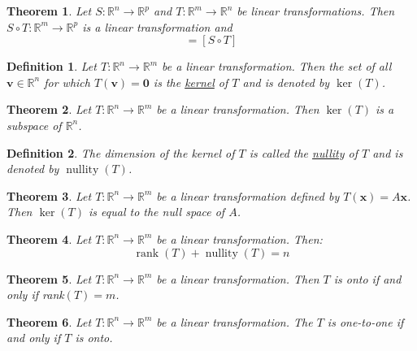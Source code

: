 \documentclass{article}
\theoremstyle{definitionstyle}
\newtheorem{definition}{Definition}[section]
\newtheorem{theorem}{Theorem}[section]
\begin{document}
\begin{theorem}
    Let $S:\mathbb{R}^n \to \mathbb{R}^p$ and $T:\mathbb{R}^m \to \mathbb{R}^n$ be linear transformations.
    Then $S \circ T: \mathbb{R}^m \to \mathbb{R}^p$ is a linear transformation and
    \begin{equation*}
        [S][T]=[S \circ T]
    \end{equation*}
\end{theorem}

\begin{definition}
    Let $T:\mathbb{R}^n \to \mathbb{R}^m$ be a linear transformation. Then the set of all $\mathbf{v} \in \mathbb{R}^n$
    for which $T(\mathbf{v})=\mathbf{0}$ is the \underline{kernel} of $T$ and is denoted by $\ker(T)$.
\end{definition}

\begin{theorem}
    Let $T:\mathbb{R}^n \to \mathbb{R}^m$ be a linear transformation. Then $\ker(T)$ is a
    subspace of $\mathbb{R}^n$.
\end{theorem}

\begin{definition}
    The dimension of the kernel of $T$ is called the \underline{nullity} of $T$ and is denoted
    by $\operatorname*{nullity}(T)$.
\end{definition}

\begin{theorem}
    Let $T:\mathbb{R}^n \to \mathbb{R}^m$ be a linear transformation defined by $T(\mathbf{x})=A\mathbf{x}$. Then
    $\ker(T)$ is equal to the null space of $A$.
\end{theorem}

\begin{theorem}
    Let $T:\mathbb{R}^n \to \mathbb{R}^m$ be a linear transformation. Then:
    \begin{equation*}
        \operatorname*{rank}(T)+\operatorname*{nullity}(T)=n
    \end{equation*}
\end{theorem}

\begin{theorem}
    Let $T:\mathbb{R}^n \to \mathbb{R}^m$ be a linear transformation. Then $T$ is onto if and only if rank$(T)=m$.
\end{theorem}

\begin{theorem}
    Let $T:\mathbb{R}^n \to \mathbb{R}^m$ be a linear transformation. The $T$ is one-to-one if and only if $T$ is onto.
\end{theorem}
\end{document}
